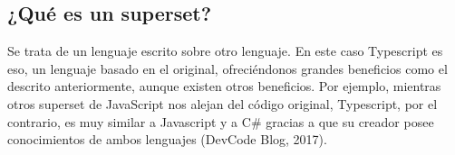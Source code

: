 \subsection{¿Qué es un superset?}

Se trata de un lenguaje escrito sobre otro lenguaje. En este caso Typescript es eso, un lenguaje basado en el original, ofreciéndonos grandes beneficios como el descrito anteriormente, aunque existen otros beneficios. Por ejemplo, mientras otros superset de JavaScript nos alejan del código original, Typescript, por el contrario, es muy similar a Javascript y a C# gracias a que su creador posee conocimientos de ambos lenguajes (DevCode Blog, 2017).

